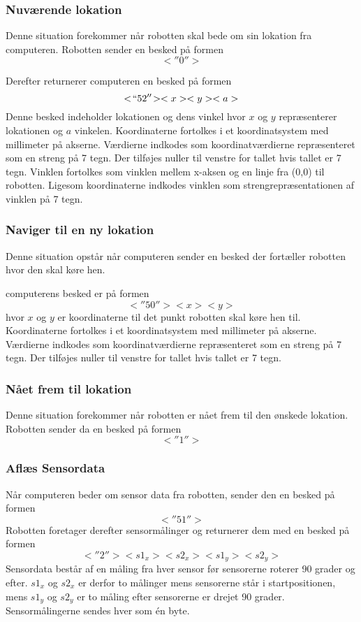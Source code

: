 \subsubsection{Nuværende lokation}\label{protokol:positur}
Denne situation forekommer når robotten skal bede om sin lokation fra computeren.
Robotten sender en besked på formen 
\[
< \! ''0'' \! >
\]


Derefter returnerer computeren en besked på formen
\[< \! ``52'' \!><x><y><a>\]
Denne besked indeholder lokationen og dens vinkel hvor $x$ og $y$ repræsenterer lokationen og $a$ vinkelen.
Koordinaterne fortolkes i et koordinatsystem med millimeter på akserne.
Værdierne indkodes som koordinatværdierne repræsenteret som en streng på 7 tegn.
Der tilføjes nuller til venstre for tallet hvis tallet er 7 tegn.
Vinklen fortolkes som vinklen mellem x-aksen og en linje fra (0,0) til robotten.
Ligesom koordinaterne indkodes vinklen som strengrepræsentationen af vinklen på 7 tegn.

\subsubsection{Naviger til en ny lokation}\label{design:protokol_navigertilny}
Denne situation opstår når computeren sender en besked der fortæller robotten hvor den skal køre hen.

computerens besked er på formen
 \[<\! ''50'' \!><x><y>\] 
hvor $x$ og $y$ er koordinaterne til det punkt robotten skal køre hen til.
Koordinaterne fortolkes i et koordinatsystem med millimeter på akserne.
Værdierne indkodes som koordinatværdierne repræsenteret som en streng på 7 tegn.
Der tilføjes nuller til venstre for tallet hvis tallet er 7 tegn.

\subsubsection{Nået frem til lokation}
Denne situation forekommer når robotten er nået frem til den ønskede lokation.
Robotten sender da en besked på formen \[<\!''1''\!>\]

\subsubsection{Aflæs Sensordata}
Når computeren beder om sensor data fra robotten, sender den en besked på formen \[<\!''51''\!>\]
Robotten foretager derefter sensormålinger og returnerer dem med en besked på formen  
\[<\!''2''\!><s1_x> <s2_x> <s1_y> <s2_y>\]
Sensordata består af en måling fra hver sensor før sensorerne roterer 90 grader og efter.
$ s1_x $ og $ s2_x $ er derfor to målinger mens sensorerne står i startpositionen, mens $ s1_y $ og $ s2_y $ er to måling efter sensorerne er drejet 90 grader.
Sensormålingerne sendes hver som én byte.